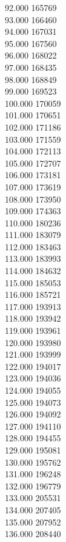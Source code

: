 { 92.000	165769 \\
 93.000	166460 \\
 94.000	167031 \\
 95.000	167560 \\
 96.000	168022 \\
 97.000	168435 \\
 98.000	168849 \\
 99.000	169523 \\
 100.000	170059 \\
 101.000	170651 \\
 102.000	171186 \\
 103.000	171559 \\
 104.000	172113 \\
 105.000	172707 \\
 106.000	173181 \\
 107.000	173619 \\
 108.000	173950 \\
 109.000	174363 \\
 110.000	180236 \\
 111.000	183079 \\
 112.000	183463 \\
 113.000	183993 \\
 114.000	184632 \\
 115.000	185053 \\
 116.000	185721 \\
 117.000	193913 \\
 118.000	193942 \\
 119.000	193961 \\
 120.000	193980 \\
 121.000	193999 \\
 122.000	194017 \\
 123.000	194036 \\
 124.000	194055 \\
 125.000	194073 \\
 126.000	194092 \\
 127.000	194110 \\
 128.000	194455 \\
 129.000	195081 \\
 130.000	195762 \\
 131.000	196248 \\
 132.000	196779 \\
 133.000	205531 \\
 134.000	207405 \\
 135.000	207952 \\
 136.000	208440 \\
}
